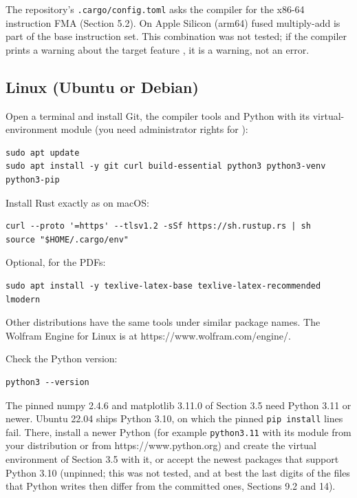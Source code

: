 \documentclass[11pt]{article}
\begin{document}
The repository's \texttt{.cargo/c\allowbreak{}onfig.to\allowbreak{}ml} asks the compiler for the x86-64 instruction FMA (Section 5.2). On Apple Silicon (arm64) fused multiply-add is part of the base instruction set. This combination was not tested; if the compiler prints a warning about the target feature \texttt{}, it is a warning, not an error.

\subsection{Linux (Ubuntu or Debian)}

Open a terminal and install Git, the compiler tools and Python with its virtual-environment module (you need administrator rights for \texttt{}):

\begin{Verbatim}[fontsize=\small]
sudo apt update
sudo apt install -y git curl build-essential python3 python3-venv python3-pip
\end{Verbatim}

Install Rust exactly as on macOS:

\begin{Verbatim}[fontsize=\small]
curl --proto '=https' --tlsv1.2 -sSf https://sh.rustup.rs | sh
source "$HOME/.cargo/env"
\end{Verbatim}

Optional, for the PDFs:

\begin{Verbatim}[fontsize=\small]
sudo apt install -y texlive-latex-base texlive-latex-recommended lmodern
\end{Verbatim}

Other distributions have the same tools under similar package names. The Wolfram Engine for Linux is at https://www.wolfram.com/engine/.

Check the Python version:

\begin{Verbatim}[fontsize=\small]
python3 --version
\end{Verbatim}

The pinned numpy 2.4.6 and matplotlib 3.11.0 of Section 3.5 need Python 3.11 or newer. Ubuntu 22.04 ships Python 3.10, on which the pinned \texttt{pip inst\allowbreak{}all} lines fail. There, install a newer Python (for example \texttt{python3.\allowbreak{}11} with its \texttt{} module from your distribution or from https://www.python.org) and create the virtual environment of Section 3.5 with it, or accept the newest packages that support Python 3.10 (unpinned; this was not tested, and at best the last digits of the files that Python writes then differ from the committed ones, Sections 9.2 and 14).
\end{document}
